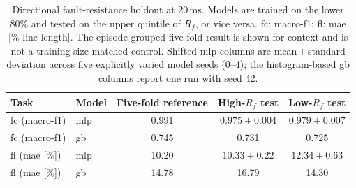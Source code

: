 \begin{table}[pos=ht]
\caption{Directional fault-resistance holdout at 20\,ms. Models are trained on the lower 80\% and tested on the upper quintile of $R_f$, or vice versa. \ac{fc}: macro-\ac{f1}; \ac{fl}: \ac{mae} [\% line length]. The episode-grouped five-fold result is shown for context and is not a training-size-matched control. Shifted \ac{mlp} columns are mean\,$\pm$\,standard deviation across five explicitly varied model seeds (0--4); the histogram-based \ac{gb} columns report one run with seed 42.}
\label{tab:generalization_shift}
\small
\centering
\begin{tabular}{llccc}
\toprule
\textbf{Task} & \textbf{Model} & \textbf{Five-fold reference} & \textbf{High-$R_f$ test} & \textbf{Low-$R_f$ test} \\
\midrule
\ac{fc} (macro-\ac{f1}) & \ac{mlp} & 0.991 & $0.975\pm0.004$ & $0.979\pm0.007$ \\
\ac{fc} (macro-\ac{f1}) & \ac{gb} & 0.745 & 0.731 & 0.725 \\
\midrule
\ac{fl} (\ac{mae} [\%]) & \ac{mlp} & 10.20 & $10.33\pm0.22$ & $12.34\pm0.63$ \\
\ac{fl} (\ac{mae} [\%]) & \ac{gb} & 14.78 & 16.79 & 14.30 \\
\bottomrule
\end{tabular}
\end{table}
